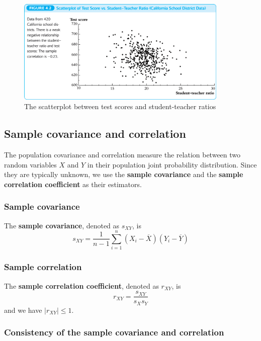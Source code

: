 \documentclass[a4paper,11pt]{article}
\begin{document}
\begin{figure}[htbp]
\centering
\includegraphics[width=0.9\textwidth]{figure/fig-4-2.png}
\caption{\label{fig:org01d3167}
The scatterplot between test scores and student-teacher ratios}
\end{figure}

\subsection{Sample covariance and correlation}
\label{sec:orgeba5041}

The population covariance and correlation measure the relation between
two random variables \(X\) and \(Y\) in their population joint probability
distribution. Since they are typically unknown, we use the \textbf{sample
covariance} and the \textbf{sample correlation coefficient} as their
estimators. 

\subsubsection*{Sample covariance}
\label{sec:orgd877752}

The \textbf{sample covariance}, denoted as \(s_{XY}\), is
\[ s_{XY} = \frac{1}{n-1}\sum^n_{i=1}(X_i - \overline{X})(Y_i -
\overline{Y}) \]

\subsubsection*{Sample correlation}
\label{sec:orgb7c0c58}

The \textbf{sample correlation coefficient}, denoted as \(r_{XY}\), is
\[ r_{XY} = \frac{s_{XY}}{s_X s_Y} \]
and we have \(|r_{XY}| \leq 1\). 

\subsubsection*{Consistency of the sample covariance and correlation}
\label{sec:org8f46f3b}
\end{document}
